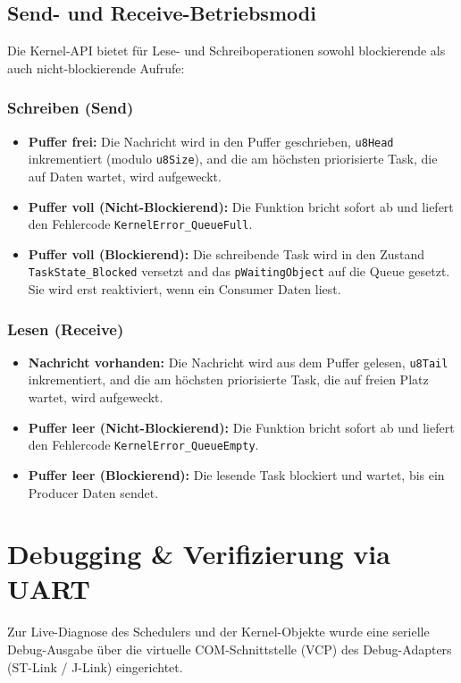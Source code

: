 \documentclass[11pt,a4paper]{article}
\begin{document}
\subsection{Send- und Receive-Betriebsmodi}
Die Kernel-API bietet für Lese- und Schreiboperationen sowohl blockierende als auch nicht-blockierende Aufrufe:

\subsubsection{Schreiben (Send)}
\begin{itemize}
    \item \textbf{Puffer frei:} Die Nachricht wird in den Puffer geschrieben, \texttt{u8Head} inkrementiert (modulo \texttt{u8Size}), and die am höchsten priorisierte Task, die auf Daten wartet, wird aufgeweckt.
    \item \textbf{Puffer voll (Nicht-Blockierend):} Die Funktion bricht sofort ab und liefert den Fehlercode \texttt{KernelError\_QueueFull}.
    \item \textbf{Puffer voll (Blockierend):} Die schreibende Task wird in den Zustand \texttt{TaskState\_Blocked} versetzt and das \texttt{pWaitingObject} auf die Queue gesetzt. Sie wird erst reaktiviert, wenn ein Consumer Daten liest.
\end{itemize}

\subsubsection{Lesen (Receive)}
\begin{itemize}
    \item \textbf{Nachricht vorhanden:} Die Nachricht wird aus dem Puffer gelesen, \texttt{u8Tail} inkrementiert, and die am höchsten priorisierte Task, die auf freien Platz wartet, wird aufgeweckt.
    \item \textbf{Puffer leer (Nicht-Blockierend):} Die Funktion bricht sofort ab und liefert den Fehlercode \texttt{KernelError\_QueueEmpty}.
    \item \textbf{Puffer leer (Blockierend):} Die lesende Task blockiert und wartet, bis ein Producer Daten sendet.
\end{itemize}

\section{Debugging \& Verifizierung via UART}
Zur Live-Diagnose des Schedulers und der Kernel-Objekte wurde eine serielle Debug-Ausgabe über die virtuelle COM-Schnittstelle (VCP) des Debug-Adapters (ST-Link / J-Link) eingerichtet.
\end{document}
